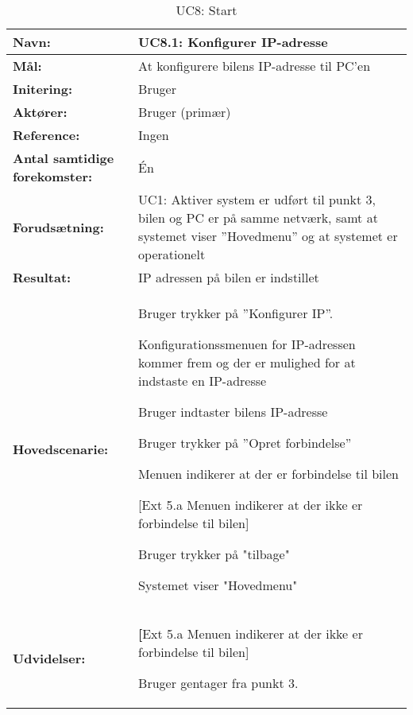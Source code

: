 \begin{table}[h]
\begin{tabularx}{\textwidth}{| >{\raggedright\arraybackslash}p{3.3 cm} | >{\raggedright\arraybackslash}X |} \hline

\textbf{Navn:} 						& UC8.1: Konfigurer IP-adresse\\ \hline
\textbf{Mål:}						& At konfigurere bilens IP-adresse til PC'en\\ \hline
\textbf{Initering:}					& Bruger \\ \hline
\textbf{Aktører:} 					& Bruger (primær) \\ \hline
\textbf{Reference:} 					& Ingen\\ \hline
\textbf{Antal samtidige forekomster:} & Én \\ \hline
\textbf{Forudsætning:} 				& UC1: Aktiver system er udført til punkt 3, bilen og PC er på samme netværk, samt at systemet viser ''Hovedmenu'' og at systemet er operationelt\\ \hline
\textbf{Resultat:}					& IP adressen på bilen er indstillet\\ \hline
\textbf{Hovedscenarie:}				& 

\begin{packed_enum}
\item Bruger trykker på ''Konfigurer IP''.
\item Konfigurationssmenuen for IP-adressen kommer frem og der er mulighed for at indstaste en IP-adresse
\item Bruger indtaster bilens IP-adresse
\item Bruger trykker på ''Opret forbindelse'' 
\item Menuen indikerer at der er forbindelse til bilen
	\begin{packed_item}\itemsep1pt \parskip0pt \parsep0pt
	\item {[}Ext 5.a Menuen indikerer at der ikke er forbindelse til bilen{]}
	\end{packed_item}
\item Bruger trykker på "tilbage"
\item Systemet viser "Hovedmenu"
\end{packed_enum} \\ \hline
\textbf{Udvidelser:}				&  
\textbf{[}Ext 5.a Menuen indikerer at der ikke er forbindelse til bilen{]}
	\begin{packed_enum}\itemsep1pt \parskip0pt \parsep0pt
	\item Bruger gentager fra punkt 3. 
	\end{packed_enum}
\\ \hline
\end{tabularx}
\caption{UC8: Start}
\label{tbl:UC8}
\end{table}